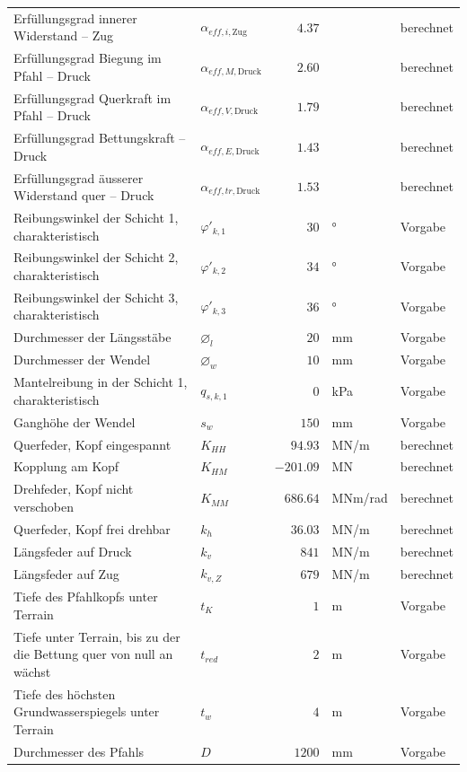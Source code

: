 \documentclass[11pt,a4paper]{article}
\begin{document}
\begin{xltabular}{\linewidth}{>{\raggedright\arraybackslash}Xlrll}
Erfüllungsgrad innerer Widerstand – Zug & $\alpha_{eff,i,\text{Zug}}$ & $4.37$ &  & berechnet \\
Erfüllungsgrad Biegung im Pfahl – Druck & $\alpha_{eff,M,\text{Druck}}$ & $2.60$ &  & berechnet \\
Erfüllungsgrad Querkraft im Pfahl – Druck & $\alpha_{eff,V,\text{Druck}}$ & $1.79$ &  & berechnet \\
Erfüllungsgrad Bettungskraft – Druck & $\alpha_{eff,E,\text{Druck}}$ & $1.43$ &  & berechnet \\
Erfüllungsgrad äusserer Widerstand quer – Druck & $\alpha_{eff,tr,\text{Druck}}$ & $1.53$ &  & berechnet \\
Reibungswinkel der Schicht 1, charakteristisch & $\varphi'_{k,1}$ & $30$ & ° & Vorgabe \\
Reibungswinkel der Schicht 2, charakteristisch & $\varphi'_{k,2}$ & $34$ & ° & Vorgabe \\
Reibungswinkel der Schicht 3, charakteristisch & $\varphi'_{k,3}$ & $36$ & ° & Vorgabe \\
Durchmesser der Längsstäbe & $\varnothing_l$ & $20$ & mm & Vorgabe \\
Durchmesser der Wendel & $\varnothing_w$ & $10$ & mm & Vorgabe \\
Mantelreibung in der Schicht 1, charakteristisch & $q_{s,k,1}$ & $0$ & kPa & Vorgabe \\
Ganghöhe der Wendel & $s_w$ & $150$ & mm & Vorgabe \\
Querfeder, Kopf eingespannt & $K_{HH}$ & $94.93$ & MN/m & berechnet \\
Kopplung am Kopf & $K_{HM}$ & $-201.09$ & MN & berechnet \\
Drehfeder, Kopf nicht verschoben & $K_{MM}$ & $686.64$ & MNm/rad & berechnet \\
Querfeder, Kopf frei drehbar & $k_h$ & $36.03$ & MN/m & berechnet \\
Längsfeder auf Druck & $k_v$ & $841$ & MN/m & berechnet \\
Längsfeder auf Zug & $k_{v,Z}$ & $679$ & MN/m & berechnet \\
Tiefe des Pfahlkopfs unter Terrain & $t_K$ & $1$ & m & Vorgabe \\
Tiefe unter Terrain, bis zu der die Bettung quer von null an wächst & $t_{red}$ & $2$ & m & Vorgabe \\
Tiefe des höchsten Grundwasserspiegels unter Terrain & $t_w$ & $4$ & m & Vorgabe \\
Durchmesser des Pfahls & $D$ & $1200$ & mm & Vorgabe \\

\end{xltabular}
\end{document}
